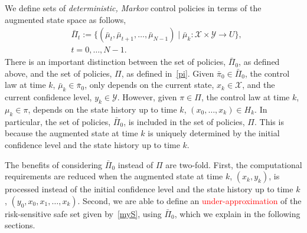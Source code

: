 \documentclass[letterpaper, 10 pt, conference]{ieeeconf}  %
\begin{document}
We define sets of \textit{deterministic, Markov} control policies in terms of the augmented state space as follows,
%
\begin{equation}
\label{augpi}
\begin{aligned}
& \bar{\Pi}_t := \{ (\bar{\mu}_t, \bar{\mu}_{t+1}, \dots, \bar{\mu}_{N-1}) \mid \bar{\mu}_k: \mathcal{X} \times \mathcal{Y} \rightarrow U \},\\
& t = 0, \dots, N-1.
\end{aligned}
\end{equation}
%
There is an important distinction between the set of policies, $\bar{\Pi}_0$, as defined above,
and the set of policies, $\Pi$, as defined in~\eqref{pi}.
Given $\bar{\pi}_0 \in \bar{\Pi}_0$, the control law at time $k$, $\bar{\mu}_k \in \bar{\pi}_0$, 
only depends on the current state, $x_k \in \mathcal{X}$, and the current confidence level, $y_k \in \mathcal{Y}$.
However, given $\pi \in \Pi$, the control law at time $k$, $\mu_k \in \pi$, 
depends on the state history up to time $k$, $(x_0, \dots, x_k) \in H_k$.
In particular, the set of policies, $\bar{\Pi}_0$, is included in the set of policies, $\Pi$.
This is because the augmented state at time $k$ is uniquely determined by the initial confidence level and the state history up to time $k$.\footnotemark 
{}

The benefits of considering $\bar{\Pi}_0$ instead of $\Pi$ are two-fold. 
First, the computational requirements are reduced when the augmented state at time $k$, $(x_k, y_k)$, 
is processed instead of the initial confidence level and the state history up to time $k$, $(y_0, x_0, x_1, \hdots, x_k)$. 
Second, we are able to define an \textcolor{red}{under-approximation}
of the risk-sensitive safe set given by~\eqref{myS}, using $\bar{\Pi}_0$, which we explain in the following sections.
%
\end{document}
